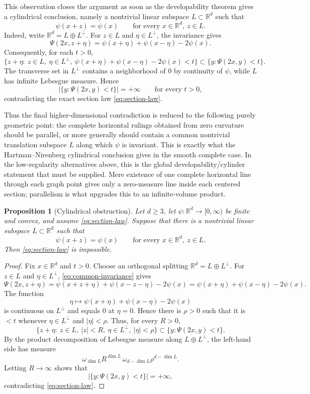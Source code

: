 \documentclass[11pt]{amsart}
\def\R{\mathbb{R}}
\newtheorem{proposition}[theorem]{Proposition}
\begin{document}
This observation closes the argument as soon as the developability theorem
gives a cylindrical conclusion, namely a nontrivial linear subspace
$L\subset\R^d$ such that
\[
    \psi(x+z)=\psi(x)
    \qquad\text{for every }x\in\R^d,\ z\in L.
\]
Indeed, write $\R^d=L\oplus L^\perp$.  For $z\in L$ and $\eta\in L^\perp$,
the invariance gives
\[
    \Psi(2x,z+\eta)
    =\psi(x+\eta)+\psi(x-\eta)-2\psi(x).
\]
Consequently, for each $t>0$,
\[
    \{z+\eta:\ z\in L,\ \eta\in L^\perp,\
      \psi(x+\eta)+\psi(x-\eta)-2\psi(x)<t\}
    \subset \{y:\Psi(2x,y)<t\}.
\]
The transverse set in $L^\perp$ contains a neighborhood of $0$ by continuity
of $\psi$, while $L$ has infinite Lebesgue measure.  Hence
\[
    |\{y:\Psi(2x,y)<t\}|=+\infty
    \qquad\text{for every }t>0,
\]
contradicting the exact section law \eqref{eq:section-law}.

Thus the final higher-dimensional contradiction is reduced to the following
purely geometric point: the complete horizontal rulings obtained from zero
curvature should be parallel, or more generally should contain a common
nontrivial translation subspace $L$ along which $\psi$ is invariant.  This is
exactly what the Hartman--Nirenberg cylindrical conclusion gives in the smooth
complete case.  In the low-regularity alternatives above, this is the global
developability/cylinder statement that must be supplied.  Mere existence of one
complete horizontal line through each graph point gives only a zero-measure
line inside each centered section; parallelism is what upgrades this to an
infinite-volume product.

\begin{proposition}[Cylindrical obstruction]\label{prop:cylindrical-obstruction}
Let $d\geq3$, let $\psi:\R^d\to[0,\infty)$ be finite and convex, and assume
\eqref{eq:section-law}.  Suppose that there is a nontrivial linear subspace
$L\subset\R^d$ such that
\begin{equation}\label{eq:common-invariance}
    \psi(x+z)=\psi(x)
    \qquad\text{for every }x\in\R^d,\ z\in L.
\end{equation}
Then \eqref{eq:section-law} is impossible.
\end{proposition}

\begin{proof}
Fix $x\in\R^d$ and $t>0$.  Choose an orthogonal splitting
$\R^d=L\oplus L^\perp$.  For $z\in L$ and $\eta\in L^\perp$,
\eqref{eq:common-invariance} gives
\[
    \Psi(2x,z+\eta)
    =
    \psi(x+z+\eta)+\psi(x-z-\eta)-2\psi(x)
    =
    \psi(x+\eta)+\psi(x-\eta)-2\psi(x).
\]
The function
\[
    \eta\mapsto \psi(x+\eta)+\psi(x-\eta)-2\psi(x)
\]
is continuous on $L^\perp$ and equals $0$ at $\eta=0$.  Hence there is
$\rho>0$ such that it is $<t$ whenever $\eta\in L^\perp$ and $|\eta|<\rho$.
Thus, for every $R>0$,
\[
    \{z+\eta:\ z\in L,\ |z|<R,\ \eta\in L^\perp,\ |\eta|<\rho\}
    \subset \{y:\Psi(2x,y)<t\}.
\]
By the product decomposition of Lebesgue measure along
$L\oplus L^\perp$, the left-hand side has measure
\[
    \omega_{\dim L}R^{\dim L}\,\omega_{d-\dim L}\rho^{d-\dim L}.
\]
Letting $R\to\infty$ shows that
\[
    |\{y:\Psi(2x,y)<t\}|=+\infty,
\]
contradicting \eqref{eq:section-law}.
\end{proof}
\end{document}
